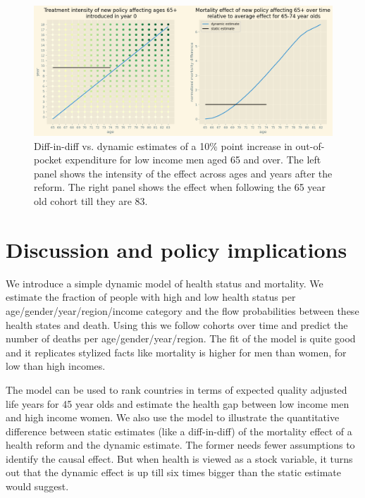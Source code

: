 \documentclass[a4paper,12pt]{article}
\begin{document}
\begin{figure}[htbp]
\centering
\includegraphics[width=.9\linewidth]{./figures/years_treatment.png}
\caption{\label{fig:years_treatment}Diff-in-diff vs. dynamic estimates of a 10\% point increase in out-of-pocket expenditure for low income men aged 65 and over. The left panel shows the intensity of the effect across ages and years after the reform. The right panel shows the effect when following the 65 year old cohort till they are 83.}
\end{figure}
\section{Discussion and policy implications}
\label{sec:org2423378}

We introduce a simple dynamic model of health status and mortality. We estimate the fraction of people with high and low health status per age/gender/year/region/income category and the flow probabilities between these health states and death. Using this we follow cohorts over time and predict the number of deaths per age/gender/year/region. The fit of the model is quite good and it replicates stylized facts like mortality is higher for men than women, for low than high incomes.

The model can be used to rank countries in terms of expected quality adjusted life years for 45 year olds and estimate the health gap between low income men and high income women. We also use the model to illustrate the quantitative difference between static estimates (like a diff-in-diff) of the mortality effect of a health reform and the dynamic estimate. The former needs fewer assumptions to identify the causal effect. But when health is viewed as a stock variable, it turns out that the dynamic effect is up till six times bigger than the static estimate would suggest.
\end{document}
